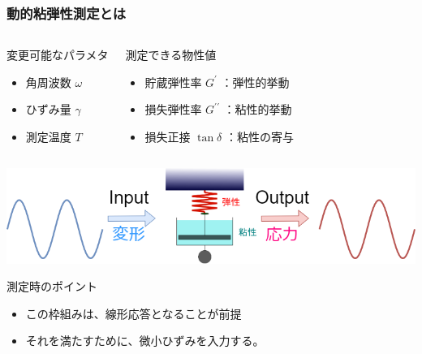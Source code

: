 \documentclass[12pt, dvipdfmx]{beamer}
\begin{document}
\begin{frame}
	\frametitle{動的粘弾性測定とは}

		\vspace{-5mm}
	\begin{columns}[T, onlytextwidth]
			\begin{exampleblock}{変更可能なパラメタ}
				\begin{itemize}
				\item 角周波数 $\omega$
				\item ひずみ量 $\gamma$
				\item 測定温度 $T$
				\end{itemize}
			\end{exampleblock}
			\begin{block}{測定できる物性値}
				\begin{itemize}
				\item 貯蔵弾性率 $G^{\prime}$ ：弾性的挙動
				\item 損失弾性率 $G^{\prime \prime}$ ：粘性的挙動
				\item 損失正接 $\tan \delta$ ：粘性の寄与
				\end{itemize}
			\end{block}
	\end{columns}

		\vspace{3mm}
			\centering
				\includegraphics[width=.9\textwidth]{dynamic_ViscoElast_2.png}
		
	\begin{alertblock}{測定時のポイント}
		\begin{itemize}
			\item この枠組みは、線形応答となることが前提
			\item それを満たすために、微小ひずみを入力する。
		\end{itemize}
	\end{alertblock}
\end{frame}
\end{document}
